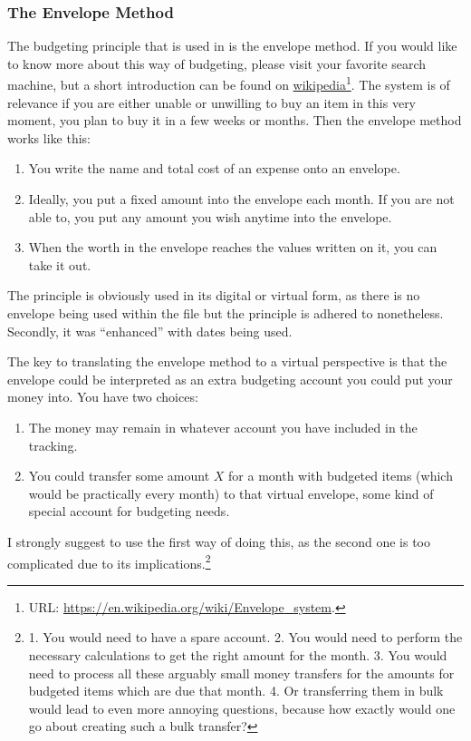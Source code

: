 \subsubsection{The Envelope Method}
\label{subsubsec:budgeting-the-envelope-method}

The budgeting principle that is used in \tfn is the envelope method.
If you would like to know more about this way of budgeting, please visit your favorite search machine, but a short introduction can be found on \href{https://en.wikipedia.org/wiki/Envelope_system}{wikipedia}\footnote{URL: \href{https://en.wikipedia.org/wiki/Envelope_system}{https://en.wikipedia.org/wiki/Envelope{\_}system}.}.
The system is of relevance if you are either unable or unwilling to buy an item in this very moment, \ie you plan to buy it in a few weeks or months.
Then the envelope method works like this:
\begin{enumerate}
	\item You write the name and total cost of an expense onto an envelope.
	\item Ideally, you put a fixed amount into the envelope each month.
	If you are not able to, you put any amount you wish anytime into the envelope.
	\item When the worth in the envelope reaches the values written on it, you can take it out.
\end{enumerate}
The principle is obviously used in its digital or virtual form, as there is no envelope being used within the file but the principle is adhered to nonetheless.
Secondly, it was ``enhanced'' with dates being used.

The key to translating the envelope method to a virtual perspective is that the envelope could be interpreted as an extra budgeting account you could put your money into.
You have two choices:
\begin{enumerate}
	\item The money may remain in whatever account you have included in the tracking.
	\item You could transfer some amount \( X \) for a month with budgeted items (which would be practically every month) to that virtual envelope, \ie some kind of special account for budgeting needs.
\end{enumerate}

I strongly suggest to use the first way of doing this, as the second one is too complicated due to its implications.\footnote{%
1. You would need to have a spare account.
2. You would need to perform the necessary calculations to get the right amount for the month.
3. You would need to process all these arguably small money transfers for the amounts for budgeted items which are due that month.
4. Or transferring them in bulk would lead to even more annoying questions, because how exactly would one go about creating such a bulk transfer?}

